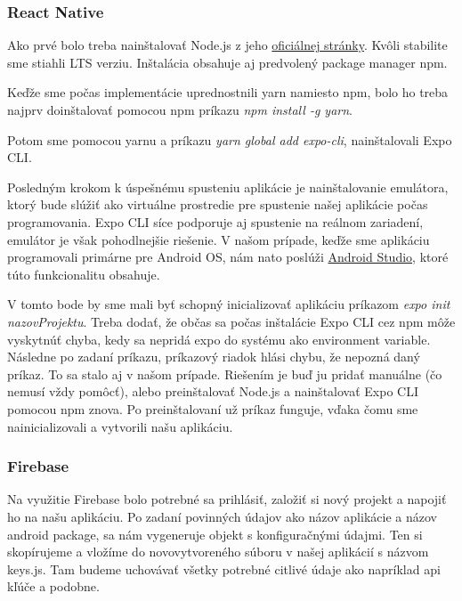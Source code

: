 \subsubsection{React Native}
\begin{itemize}
{\item Ako prvé bolo treba nainštalovať Node.js z jeho \href{https://nodejs.org/en/download/}{oficiálnej stránky}. Kvôli stabilite sme stiahli LTS verziu. Inštalácia obsahuje aj predvolený package manager npm.} 
{\item Keďže sme počas implementácie uprednostnili yarn namiesto npm, bolo ho treba najprv doinštalovať pomocou npm príkazu \textit{npm install -g yarn}.} 
{\item Potom sme pomocou yarnu a príkazu \textit{yarn global add expo-cli}, nainštalovali Expo CLI.} 
{\item Posledným krokom k úspešnému spusteniu aplikácie je nainštalovanie emulátora, ktorý bude slúžiť ako virtuálne prostredie pre spustenie našej aplikácie počas programovania. Expo CLI síce podporuje aj spustenie na reálnom zariadení, emulátor je však pohodlnejšie riešenie. V našom prípade, keďže sme aplikáciu programovali primárne pre Android OS, nám nato poslúži \href{https://developer.android.com/studio}{Android Studio}, ktoré túto funkcionalitu obsahuje.}
\end{itemize}

V tomto bode by sme mali byť schopný inicializovať aplikáciu príkazom \textit{expo init nazovProjektu}.
Treba dodať, že občas sa počas inštalácie Expo CLI cez npm môže vyskytnúť chyba, kedy sa nepridá expo do systému ako environment variable. Následne po zadaní príkazu, príkazový riadok hlási chybu, že nepozná daný príkaz. To sa stalo aj v našom prípade. Riešením je buď ju pridať manuálne (čo nemusí vždy pomôcť), alebo preinštalovať Node.js a nainštalovať Expo CLI pomocou npm znova. Po preinštalovaní už príkaz funguje, vďaka čomu sme nainicializovali a vytvorili našu aplikáciu. 

\subsubsection{Firebase}
Na využitie Firebase bolo potrebné sa prihlásiť, založiť si nový projekt a napojiť ho na našu aplikáciu. Po zadaní povinných údajov ako názov aplikácie a názov android package, sa nám vygeneruje objekt s konfiguračnými údajmi. Ten si skopírujeme a vložíme do novovytvoreného súboru v našej aplikácií s názvom keys.js. Tam budeme uchovávať všetky potrebné citlivé údaje ako napríklad \acrshort{api} kľúče a podobne.

